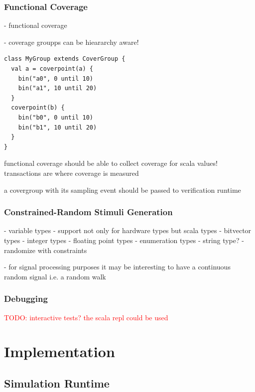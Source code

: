 \documentclass[11pt,a4paper]{report}
\newcommand{\todo}[1]{\textcolor{red}{TODO: #1}}
\begin{document}
\subsection{Functional Coverage} %

- functional coverage

- coverage groupps can be hieararchy aware!

\begin{lstlisting}
class MyGroup extends CoverGroup {
  val a = coverpoint(a) {
    bin("a0", 0 until 10)
    bin("a1", 10 until 20)
  }
  coverpoint(b) {
    bin("b0", 0 until 10)
    bin("b1", 10 until 20)
  }
}
\end{lstlisting}

functional coverage should be able to collect coverage for scala values! transactions are where coverage is measured

a covergroup with its sampling event should be passed to verification runtime

\subsection{Constrained-Random Stimuli Generation} %

- variable types
- support not only for hardware types but scala types
- bitvector types
- integer types
- floating point types
- enumeration types
- string type?
- randomize with constraints

- for signal processing purposes it may be interesting to have a continuous random signal i.e. a random walk

\subsection{Debugging} %
\todo{interactive tests? the scala repl could be used}


\chapter{Implementation} %

\section{Simulation Runtime} %
\end{document}
